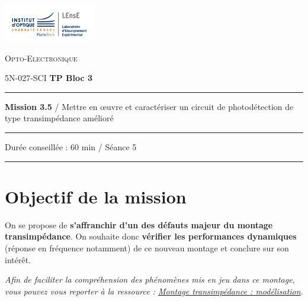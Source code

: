 \newpage
\pagestyle{empty}

\begin{minipage}[c]{.25\linewidth}
	\includegraphics[width=4cm]{images/Logo-LEnsE.png}
\end{minipage} \hfill
\begin{minipage}[c]{.4\linewidth}

\begin{center}
\vspace{0.3cm}
{\Large \textsc{Opto-Electronique}}

\medskip

5N-027-SCI \qquad \textbf{\Large TP Bloc 3}

\end{center}
\end{minipage}\hfill

\vspace{0.5cm}

\noindent \rule{\linewidth}{1pt}

{\noindent\Large \textbf{Mission 3.5} / Mettre en \oe{}uvre et caractériser un circuit de photodétection de type transimpédance amélioré} 

\vspace{-0.5cm}

\begin{center}
\noindent \rule{\linewidth}{1pt}

Durée conseillée : 60 min / Séance 5

\vspace{-0.2cm}
\noindent \rule{\linewidth}{1pt}
\end{center}

\section{Objectif de la mission}
\label{mission35}

On se propose de \textbf{s'affranchir d'un des défauts majeur du montage transimpédance}. On souhaite donc \textbf{vérifier les performances dynamiques} (réponse en fréquence notamment) de ce nouveau montage et conclure sur son intérêt.

\medskip

\textit{Afin de faciliter la compréhension des phénomènes mis en jeu dans ce montage, vous pouvez vous reporter à la ressource : \hyperref[ressource:ModeleTrans]{Montage transimpédance : modélisation}.}

